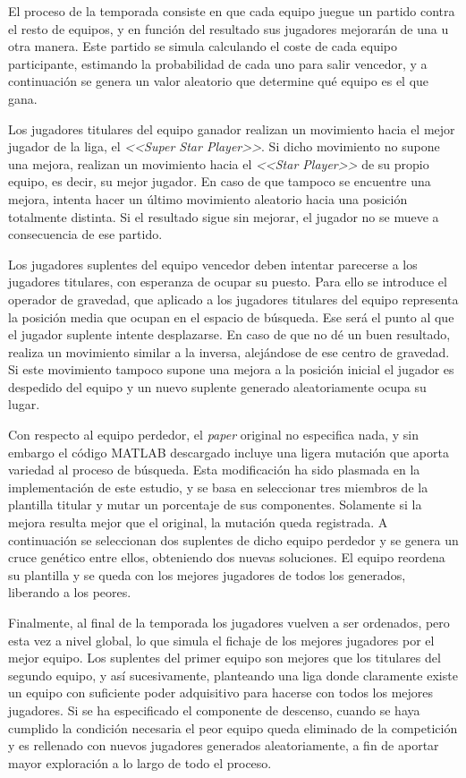 El proceso de la temporada consiste en que cada equipo juegue un partido contra el resto de equipos, y en función del resultado sus jugadores mejorarán de una u otra manera. Este partido se simula calculando el coste de cada equipo participante, estimando la probabilidad de cada uno para salir vencedor, y a continuación se genera un valor aleatorio que determine qué equipo es el que gana.

Los jugadores titulares del equipo ganador realizan un movimiento hacia el mejor jugador de la liga, el \textit{<<Super Star Player>>}. Si dicho movimiento no supone una mejora, realizan un movimiento hacia el \textit{<<Star Player>>} de su propio equipo, es decir, su mejor jugador. En caso de que tampoco se encuentre una mejora, intenta hacer un último movimiento aleatorio hacia una posición totalmente distinta. Si el resultado sigue sin mejorar, el jugador no se mueve a consecuencia de ese partido.

Los jugadores suplentes del equipo vencedor deben intentar parecerse a los jugadores titulares, con esperanza de ocupar su puesto. Para ello se introduce el operador de gravedad, que aplicado a los jugadores titulares del equipo representa la posición media que ocupan en el espacio de búsqueda. Ese será el punto al que el jugador suplente intente desplazarse. En caso de que no dé un buen resultado, realiza un movimiento similar a la inversa, alejándose de ese centro de gravedad. Si este movimiento tampoco supone una mejora a la posición inicial el jugador es despedido del equipo y un nuevo suplente generado aleatoriamente ocupa su lugar.

Con respecto al equipo perdedor, el \textit{paper} original no especifica nada, y sin embargo el código MATLAB descargado \cite{slc-matlab} incluye una ligera mutación que aporta variedad al proceso de búsqueda. Esta modificación ha sido plasmada en la implementación de este estudio, y se basa en seleccionar tres miembros de la plantilla titular y mutar un porcentaje de sus componentes. Solamente si la mejora resulta mejor que el original, la mutación queda registrada. A continuación se seleccionan dos suplentes de dicho equipo perdedor y se genera un cruce genético entre ellos, obteniendo dos nuevas soluciones. El equipo reordena su plantilla y se queda con los mejores jugadores de todos los generados, liberando a los peores.

Finalmente, al final de la temporada los jugadores vuelven a ser ordenados, pero esta vez a nivel global, lo que simula el fichaje de los mejores jugadores por el mejor equipo. Los suplentes del primer equipo son mejores que los titulares del segundo equipo, y así sucesivamente, planteando una liga donde claramente existe un equipo con suficiente poder adquisitivo para hacerse con todos los mejores jugadores. Si se ha especificado el componente de descenso, cuando se haya cumplido la condición necesaria el peor equipo queda eliminado de la competición y es rellenado con nuevos jugadores generados aleatoriamente, a fin de aportar mayor exploración a lo largo de todo el proceso.

